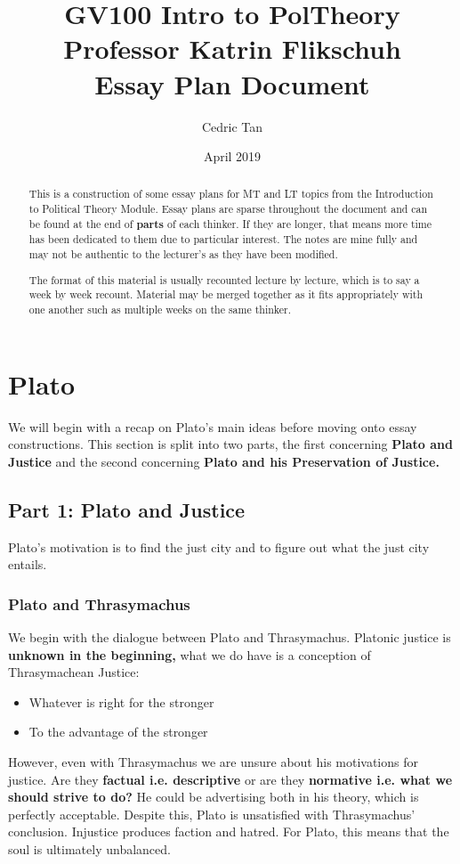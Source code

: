 \documentclass[12pt, letterpaper]{article}
\title{
	{GV100 Intro to PolTheory}\\
	{\large{Professor Katrin Flikschuh}}\\
	{\large{Essay Plan Document}}
}
\author{Cedric Tan}
\date{April 2019}
\begin{document}
\maketitle
\begin{abstract}

This is a construction of some essay plans for MT and LT topics from the Introduction to Political Theory Module. Essay plans are sparse throughout the document and can be found at the end of \textbf{parts} of each thinker. If they are longer, that means more time has been dedicated to them due to particular interest. The notes are mine fully and may not be authentic to the lecturer's as they have been modified.

The format of this material is usually recounted lecture by lecture, which is to say a week by week recount. Material may be merged together as it fits appropriately with one another such as multiple weeks on the same thinker.
\end{abstract}
\newpage
\tableofcontents
\newpage

\section{Plato}
We will begin with a recap on Plato's main ideas before moving onto essay constructions. This section is split into two parts, the first concerning \textbf{Plato and Justice} and the second concerning \textbf{Plato and his Preservation of Justice.}
\subsection{Part 1: Plato and Justice}
Plato's motivation is to find the just city and to figure out what the just city entails. 
\subsubsection{Plato and Thrasymachus}
We begin with the dialogue between Plato and Thrasymachus. Platonic justice is \textbf{unknown in the beginning,} what we do have is a conception of Thrasymachean Justice:
\begin{itemize}
	\item Whatever is right for the stronger
	\item To the advantage of the stronger
\end{itemize}
However, even with Thrasymachus we are unsure about his motivations for justice. Are they \textbf{factual i.e. descriptive} or are they \textbf{normative i.e. what we should strive to do?} He could be advertising both in his theory, which is perfectly acceptable. Despite this, Plato is unsatisfied with Thrasymachus' conclusion. Injustice produces faction and hatred. For Plato, this means that the soul is ultimately unbalanced.
\end{document}
